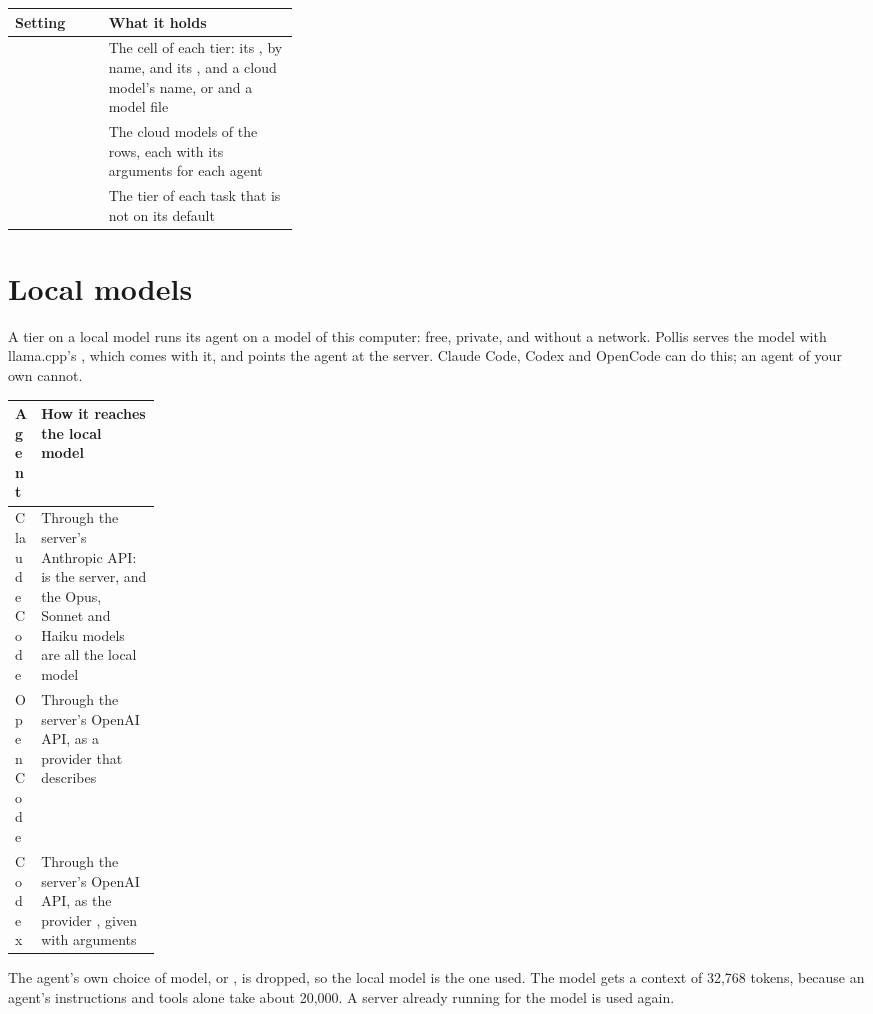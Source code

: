 \begin{center}\small
\renewcommand{\arraystretch}{1.2}
\begin{tabularx}{\linewidth}{@{}p{0.33\linewidth}L@{}}
\toprule
\textbf{Setting} & \textbf{What it holds}\\
\midrule
{} & The cell of each tier: its , by name, and its ,
   and a cloud model's name, or  and a model file\\
 & The cloud models of the rows, each with its arguments for each agent\\
 & The tier of each task that is not on its default\\
\bottomrule
\end{tabularx}
\end{center}

\section{Local models}\label{sec:local}
A tier on a local model runs its agent on a model of this computer: free, private, and without a network. Pollis
serves the model with llama.cpp's , which comes with it, and points the agent at the server.
Claude Code, Codex and OpenCode can do this; an agent of your own cannot.

\begin{center}\small
\renewcommand{\arraystretch}{1.25}
\begin{tabularx}{\linewidth}{@{}p{0.17\linewidth}L@{}}
\toprule
\textbf{Agent} & \textbf{How it reaches the local model}\\
\midrule
Claude Code & Through the server's Anthropic API:  is the server, and the Opus, Sonnet and
  Haiku models are all the local model\\
OpenCode & Through the server's OpenAI API, as a provider  that 
  describes\\
Codex & Through the server's OpenAI API, as the provider , given with  arguments\\
\bottomrule
\end{tabularx}
\end{center}
The agent's own choice of model,  or , is dropped, so the local model is the one used. The
model gets a context of 32,768 tokens, because an agent's instructions and tools alone take about 20,000. A server
already running for the model is used again.

